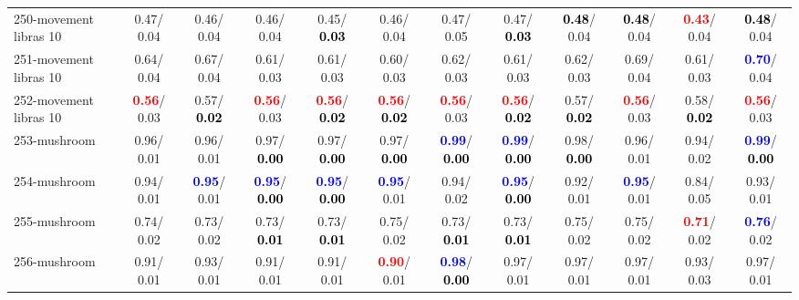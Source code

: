 \begin{table}[h]
\begin{center}
{\begin{tabular}{lc|c|c|c|c|c|c|c|c|c|c}
250-movement libras 10 &   0.47/  0.04 &   0.46/  0.04 &   0.46/  0.04 &   0.45/\textcolor{black}{\textbf{  0.03}} &   0.46/  0.04 &   0.47/  0.05 &   0.47/\textcolor{black}{\textbf{  0.03}} & \textcolor{black}{\textbf{  0.48}}/  0.04 & \textcolor{black}{\textbf{  0.48}}/  0.04 & \textcolor{red}{\textbf{  0.43}}/  0.04 & \textcolor{black}{\textbf{  0.48}}/  0.04 \\
251-movement libras 10 &   0.64/  0.04 &   0.67/  0.04 &   0.61/  0.03 &   0.61/  0.03 &   0.60/  0.03 &   0.62/  0.03 &   0.61/  0.03 &   0.62/  0.03 &   0.69/  0.04 &   0.61/  0.03 & \textcolor{blue}{\textbf{  0.70}}/  0.04 \\
252-movement libras 10 & \textcolor{red}{\textbf{  0.56}}/  0.03 &   0.57/\textcolor{black}{\textbf{  0.02}} & \textcolor{red}{\textbf{  0.56}}/  0.03 & \textcolor{red}{\textbf{  0.56}}/\textcolor{black}{\textbf{  0.02}} & \textcolor{red}{\textbf{  0.56}}/\textcolor{black}{\textbf{  0.02}} & \textcolor{red}{\textbf{  0.56}}/  0.03 & \textcolor{red}{\textbf{  0.56}}/\textcolor{black}{\textbf{  0.02}} &   0.57/\textcolor{black}{\textbf{  0.02}} & \textcolor{red}{\textbf{  0.56}}/  0.03 &   0.58/\textcolor{black}{\textbf{  0.02}} & \textcolor{red}{\textbf{  0.56}}/  0.03 \\ \hline
253-mushroom &   0.96/  0.01 &   0.96/  0.01 &   0.97/\textcolor{black}{\textbf{  0.00}} &   0.97/\textcolor{black}{\textbf{  0.00}} &   0.97/\textcolor{black}{\textbf{  0.00}} & \textcolor{blue}{\textbf{  0.99}}/\textcolor{black}{\textbf{  0.00}} & \textcolor{blue}{\textbf{  0.99}}/\textcolor{black}{\textbf{  0.00}} &   0.98/\textcolor{black}{\textbf{  0.00}} &   0.96/  0.01 &   0.94/  0.02 & \textcolor{blue}{\textbf{  0.99}}/\textcolor{black}{\textbf{  0.00}} \\
254-mushroom &   0.94/  0.01 & \textcolor{blue}{\textbf{  0.95}}/  0.01 & \textcolor{blue}{\textbf{  0.95}}/\textcolor{black}{\textbf{  0.00}} & \textcolor{blue}{\textbf{  0.95}}/\textcolor{black}{\textbf{  0.00}} & \textcolor{blue}{\textbf{  0.95}}/  0.01 &   0.94/  0.02 & \textcolor{blue}{\textbf{  0.95}}/\textcolor{black}{\textbf{  0.00}} &   0.92/  0.01 & \textcolor{blue}{\textbf{  0.95}}/  0.01 &   0.84/  0.05 &   0.93/  0.01 \\
255-mushroom &   0.74/  0.02 &   0.73/  0.02 &   0.73/\textcolor{black}{\textbf{  0.01}} &   0.73/\textcolor{black}{\textbf{  0.01}} &   0.75/  0.02 &   0.73/\textcolor{black}{\textbf{  0.01}} &   0.73/\textcolor{black}{\textbf{  0.01}} &   0.75/  0.02 &   0.75/  0.02 & \textcolor{red}{\textbf{  0.71}}/  0.02 & \textcolor{blue}{\textbf{  0.76}}/  0.02 \\
256-mushroom &   0.91/  0.01 &   0.93/  0.01 &   0.91/  0.01 &   0.91/  0.01 & \textcolor{red}{\textbf{  0.90}}/  0.01 & \textcolor{blue}{\textbf{  0.98}}/\textcolor{black}{\textbf{  0.00}} &   0.97/  0.01 &   0.97/  0.01 &   0.97/  0.01 &   0.93/  0.03 &   0.97/  0.01 \\\end{tabular}}\label{stratsALCKappa7Allalla}
\end{center}
\end{table}
